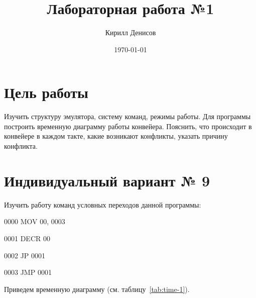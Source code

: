 \documentclass[a4paper,14pt]{extarticle}
\author{Кирилл Денисов}
\title{Лабораторная работа №1}
\date{\today}
\newcommand{\pathToCommonFolder}{/home/denilai/Documents/repos/latex/Common}
\begin{document}
	\thispagestyle{empty}
	
	\newpage
	

	
\section{Цель работы}
Изучить структуру эмулятора, систему команд, режимы работы. Для
программы построить временную диаграмму работы
конвейера. Пояснить, что происходит в конвейере в каждом
такте, какие возникают конфликты, указать причину конфликта.
\section {Индивидуальный вариант № 9}

\begin{problem}
	Изучить работу команд условных переходов данной программы:
	
	0000 MOV 00, 0003
	
	0001 DECR 00
	
	0002 JP 0001
	
	0003 JMP 0001
	
	\nonum{} Приведем временную диаграмму (см. таблицу~\ref{tab:time-1}).
\end{problem}
\end{document}
